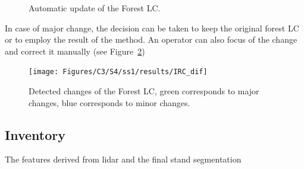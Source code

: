 \begin{figure}[htbp]
\begin{center}
\begingroup
\captionsetup[subfigure]{width=0.5\textwidth}
\hfill
{}
\endgroup
\caption{Automatic update of the Forest LC.}
\label{fig:new_BD}
\end{center}
\end{figure}

In case of major change, the decision can be taken to keep the original forest LC or to employ the result of the method. An operator can also focus of the change and correct it manually (see Figure~\ref{fig:IRC_change})

\begin{figure}[htbp]
\begin{center}
\texttt{[image: Figures/C3/S4/ss1/results/IRC\_dif]}
\caption{Detected changes of the Forest LC, green corresponds to major changes, blue corresponds to minor changes.}
\label{fig:IRC_change}
\end{center}
\end{figure}

\subsection{Inventory}
The features derived from lidar and the final stand segmentation

